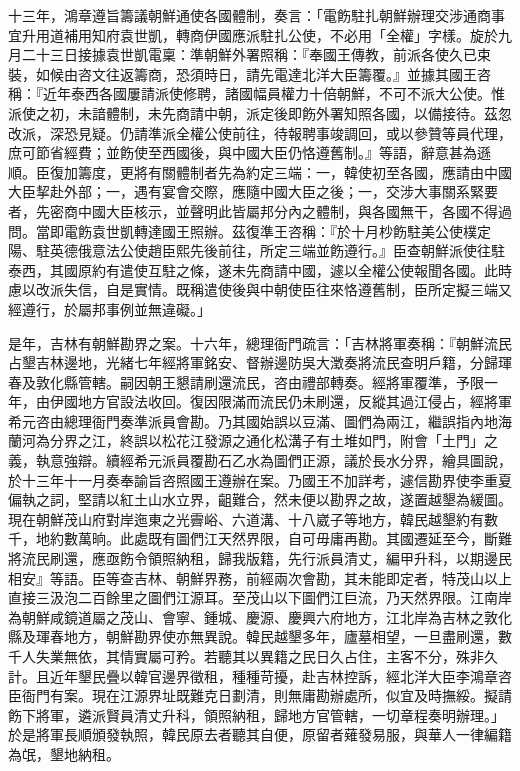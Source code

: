 \begin{pinyinscope}
十三年，鴻章遵旨籌議朝鮮通使各國體制，奏言：「電飭駐扎朝鮮辦理交涉通商事宜升用道補用知府袁世凱，轉商伊國應派駐扎公使，不必用「全權」字樣。旋於九月二十三日接據袁世凱電稟：準朝鮮外署照稱：『奉國王傳教，前派各使久已束裝，如候由咨文往返籌商，恐須時日，請先電達北洋大臣籌覆。』並據其國王咨稱：『近年泰西各國屢請派使修聘，諸國幅員權力十倍朝鮮，不可不派大公使。惟派使之初，未諳體制，未先商請中朝，派定後即飭外署知照各國，以備接待。茲忽改派，深恐見疑。仍請準派全權公使前往，待報聘事竣調回，或以參贊等員代理，庶可節省經費；並飭使至西國後，與中國大臣仍恪遵舊制。』等語，辭意甚為遜順。臣復加籌度，更將有關體制者先為約定三端：一，韓使初至各國，應請由中國大臣挈赴外部；一，遇有宴會交際，應隨中國大臣之後；一，交涉大事關系緊要者，先密商中國大臣核示，並聲明此皆屬邦分內之體制，與各國無干，各國不得過問。當即電飭袁世凱轉達國王照辦。茲復準王咨稱：『於十月杪飭駐美公使樸定陽、駐英德俄意法公使趙臣熙先後前往，所定三端並飭遵行。』臣查朝鮮派使往駐泰西，其國原約有遣使互駐之條，遂未先商請中國，遽以全權公使報聞各國。此時慮以改派失信，自是實情。既稱遣使後與中朝使臣往來恪遵舊制，臣所定擬三端又經遵行，於屬邦事例並無違礙。」

是年，吉林有朝鮮勘界之案。十六年，總理衙門疏言：「吉林將軍奏稱：『朝鮮流民占墾吉林邊地，光緒七年經將軍銘安、督辦邊防吳大澂奏將流民查明戶籍，分歸琿春及敦化縣管轄。嗣因朝王懇請刷還流民，咨由禮部轉奏。經將軍覆準，予限一年，由伊國地方官設法收回。復因限滿而流民仍未刷還，反縱其過江侵占，經將軍希元咨由總理衙門奏準派員會勘。乃其國始誤以豆滿、圖們為兩江，繼誤指內地海蘭河為分界之江，終誤以松花江發源之通化松溝子有土堆如門，附會「土門」之義，執意強辯。續經希元派員覆勘石乙水為圖們正源，議於長水分界，繪具圖說，於十三年十一月奏奉諭旨咨照國王遵辦在案。乃國王不加詳考，遽信勘界使李重夏偏執之詞，堅請以紅土山水立界，齟難合，然未便以勘界之故，遂置越墾為緩圖。現在朝鮮茂山府對岸迤東之光霽峪、六道溝、十八崴子等地方，韓民越墾約有數千，地約數萬晌。此處既有圖們江天然界限，自可毋庸再勘。其國遷延至今，斷難將流民刷還，應亟飭令領照納租，歸我版籍，先行派員清丈，編甲升科，以期邊民相安』等語。臣等查吉林、朝鮮界務，前經兩次會勘，其未能即定者，特茂山以上直接三汲泡二百餘里之圖們江源耳。至茂山以下圖們江巨流，乃天然界限。江南岸為朝鮮咸鏡道屬之茂山、會寧、鍾城、慶源、慶興六府地方，江北岸為吉林之敦化縣及琿春地方，朝鮮勘界使亦無異說。韓民越墾多年，廬墓相望，一旦盡刷還，數千人失業無依，其情實屬可矜。若聽其以異籍之民日久占住，主客不分，殊非久計。且近年墾民疊以韓官邊界徵租，種種苛擾，赴吉林控訴，經北洋大臣李鴻章咨臣衙門有案。現在江源界址既難克日劃清，則無庸勘辦處所，似宜及時撫綏。擬請飭下將軍，遴派賢員清丈升科，領照納租，歸地方官管轄，一切章程奏明辦理。」於是將軍長順頒發執照，韓民原去者聽其自便，原留者薙發易服，與華人一律編籍為氓，墾地納租。


\end{pinyinscope}
